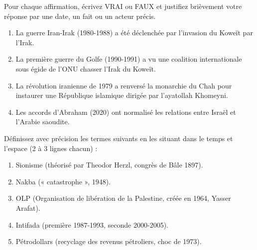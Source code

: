 \documentclass[11pt]{article}
\newcommand{\cle}[1]{{\popxbold\color{popdark}#1}}
\begin{document}
\begin{exercice}
Pour chaque affirmation, écrivez VRAI ou FAUX et justifiez brièvement votre réponse par une date, un fait ou un acteur précis.
\begin{enumerate}
    \item La guerre Iran-Irak (1980-1988) a été déclenchée par l'invasion du Koweït par l'Irak.
    \item La première guerre du Golfe (1990-1991) a vu une coalition internationale sous égide de l'ONU chasser l'Irak du Koweït.
    \item La révolution iranienne de 1979 a renversé la monarchie du Chah pour instaurer une République islamique dirigée par l'ayatollah Khomeyni.
    \item Les accords d'Abraham (2020) ont normalisé les relations entre Israël et l'Arabie saoudite.
\end{enumerate}
\end{exercice}

\begin{exercice}
Définissez avec précision les termes suivants en les situant dans le temps et l'espace (2 à 3 lignes chacun) :
\begin{enumerate}
    \item \cle{Sionisme} (théorisé par Theodor Herzl, congrès de Bâle 1897).
    \item \cle{Nakba} (« catastrophe », 1948).
    \item \cle{OLP} (Organisation de libération de la Palestine, créée en 1964, Yasser Arafat).
    \item \cle{Intifada} (première 1987-1993, seconde 2000-2005).
    \item \cle{Pétrodollars} (recyclage des revenus pétroliers, choc de 1973).
\end{enumerate}
\end{exercice}
\end{document}
